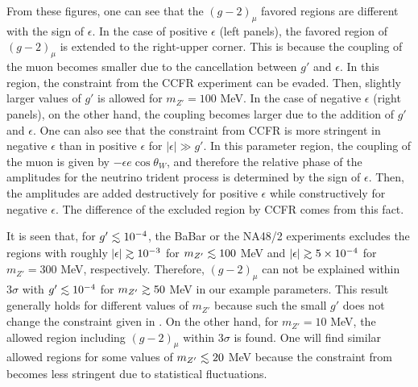 \documentclass[preprint,amsmath,amssymb,superscriptaddress,nofootinbib]{revtex4}
\newcommand{\lsim}{\raise0.3ex\hbox{$\;<$\kern-0.75em\raise-1.1ex\hbox{$\sim\;$}}}
\newcommand{\gsim}{\raise0.3ex\hbox{$\;>$\kern-0.75em\raise-1.1ex\hbox{$\sim\;$}}}
\begin{document}
From these figures, one can see that the $(g-2)_\mu$ favored regions are different with the sign of $\epsilon$. 
In the case of positive $\epsilon$ (left panels), the favored region of $(g-2)_\mu$ is extended to the right-upper corner. 
This is because the coupling of the muon becomes smaller due to the 
cancellation between $g'$ and $\epsilon$. In this region, the constraint from the CCFR experiment can be evaded.  
Then, slightly larger values of $g'$ is allowed for $m_{Z'} = 100$ MeV. 
In the case of negative $\epsilon$ (right panels), on the other hand, the coupling becomes larger due to the addition of 
$g'$ and $\epsilon$. 
%
One can also see that the constraint from CCFR is more stringent in negative $\epsilon$ than in positive $\epsilon$ 
for $|\epsilon| \gg g'$.  In this parameter region, the coupling of the muon is given by $- \epsilon e \cos\theta_W$, and 
therefore the relative phase of the amplitudes for the neutrino trident process is determined 
by the sign of $\epsilon$. Then, the amplitudes are added destructively for positive $\epsilon$ while 
constructively for negative $\epsilon$. The difference of  the excluded region by CCFR comes from this fact.


It is seen that, for $g' \lsim 10^{-4}$,  the BaBar or the NA48/2 experiments excludes the 
regions with roughly $|\epsilon| \gsim 10^{-3}$ for $m_{Z'} \lsim 100$ MeV and $|\epsilon| \gsim 5 \times 10^{-4}$ 
for $m_{Z'} = 300$ MeV, respectively.
%
Therefore, $(g-2)_\mu$ can not be explained within $3\sigma$ with $g' \lsim 10^{-4}$ for $m_{Z'} \gsim 50$ MeV 
in our example parameters.  
This result generally holds for different values of $m_{Z'}$ because such the small $g'$ does not change 
the constraint given in \cite{Lees:2014xha, Batley:2015lha}.
%
On the other hand, for $m_{Z'} = 10$ MeV, the allowed region including $(g-2)_\mu$ within $3\sigma$ is found. 
One will find similar allowed regions for some values of $m_{Z'} \lsim 20$ MeV because the constraint from \cite{Batley:2015lha} 
becomes less stringent due to statistical fluctuations. 
%
\end{document}
